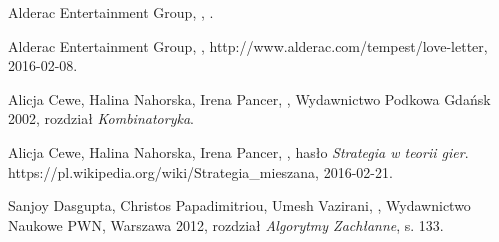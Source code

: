 \documentclass[11pt]{aghdpl}
\author{Damian Malarczyk}
\date{2015}
\begin{document}
\titlepages
\setcounter{tocdepth}{3}
\tableofcontents
\clearpage









\begin{thebibliography}{1}
	
\bibitem{}
\label{bib:loveLetterGame}
Alderac Entertainment Group,
,
.


\bibitem{}
\label{bib:loveLetterWebsite}
Alderac Entertainment Group,
,
\newblock http://www.alderac.com/tempest/love-letter, 2016-02-08.

\bibitem{}
\label{bib:tabliceMatematyczne}
Alicja Cewe, Halina Nahorska, Irena Pancer,
,
\newblock Wydawnictwo Podkowa Gdańsk 2002,
\newblock rozdział {\em Kombinatoryka}.

\bibitem{}
\label{bib:wiki_StrategiaTeoriaGier}
Alicja Cewe, Halina Nahorska, Irena Pancer,
, hasło {\em Strategia w teorii gier}.
\newblock https://pl.wikipedia.org/wiki/Strategia\_mieszana, 2016-02-21.

\bibitem{}
\label{bib:algorytmy_zachlanny}
Sanjoy Dasgupta, Christos Papadimitriou, Umesh Vazirani,
,
\newblock Wydawnictwo Naukowe PWN, Warszawa 2012,
\newblock rozdział {\em Algorytmy Zachłanne}, s. 133.

\end{thebibliography}
\end{document}
